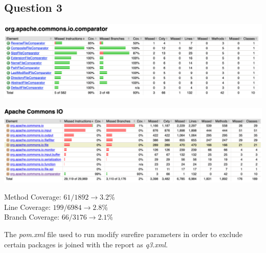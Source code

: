 \subsection*{Question 3}

\begin{center}
        \includegraphics[width=1.1\textwidth]{img/partC1.png}
\end{center}

\begin{center}
        \includegraphics[width=1.1\textwidth]{img/partC2.png}
\end{center}

\noindent Method Coverage: $61/1892 \rightarrow 3.2\%$\\
\noindent Line Coverage: $199/6984 \rightarrow 2.8\%$\\
\noindent Branch Coverage: $66/3176 \rightarrow 2.1\%$

\noindent The \textit{pom.xml} file used to run modify surefire parameters in order to exclude certain packages is joined with the report as \textit{q3.xml}.
